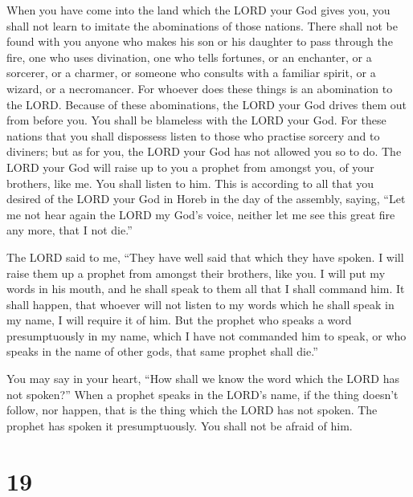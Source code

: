  When you have come into the land which the LORD your God
gives you, you shall not learn to imitate the abominations of those
nations.  There shall not be found with you anyone who
makes his son or his daughter to pass through the fire, one who uses
divination, one who tells fortunes, or an enchanter, or a sorcerer,
 or a charmer, or someone who consults with a familiar
spirit, or a wizard, or a necromancer.  For whoever does
these things is an abomination to the LORD. Because of these
abominations, the LORD your God drives them out from before you.
 You shall be blameless with the LORD your God.
 For these nations that you shall dispossess listen to
those who practise sorcery and to diviners; but as for you, the LORD
your God has not allowed you so to do.  The LORD your God
will raise up to you a prophet from amongst you, of your brothers, like
me. You shall listen to him.  This is according to all
that you desired of the LORD your God in Horeb in the day of the
assembly, saying, ``Let me not hear again the LORD my God's voice,
neither let me see this great fire any more, that I not die.''

 The LORD said to me, ``They have well said that which
they have spoken.  I will raise them up a prophet from
amongst their brothers, like you. I will put my words in his mouth, and
he shall speak to them all that I shall command him.  It
shall happen, that whoever will not listen to my words which he shall
speak in my name, I will require it of him.  But the
prophet who speaks a word presumptuously in my name, which I have not
commanded him to speak, or who speaks in the name of other gods, that
same prophet shall die.''

 You may say in your heart, ``How shall we know the word
which the LORD has not spoken?''  When a prophet speaks
in the LORD's name, if the thing doesn't follow, nor happen, that is the
thing which the LORD has not spoken. The prophet has spoken it
presumptuously. You shall not be afraid of him.

\hypertarget{section-18}{%
\section{19}\label{section-18}}

